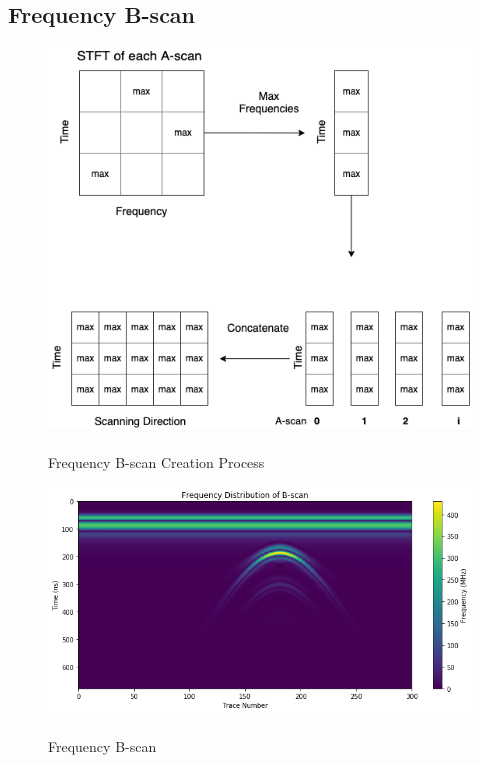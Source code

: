 \subsection{Frequency B-scan}
\vspace{0.5\baselineskip}

\begin{figure}[H]
    \centering
    \includegraphics[width=0.8\linewidth]{figures/bscan_processing.png}
    
    \caption{\\Frequency B-scan Creation Process}
    \label{fig:bscan_processing}
\end{figure}

\vspace{0.5\baselineskip}
\begin{figure}[H]
    \centering
    \includegraphics[width=0.6\linewidth]{figures/stft_b_scan_clean.png}
    
    \caption{\\Frequency B-scan}
    \label{fig:tf-bscan}
\end{figure}


